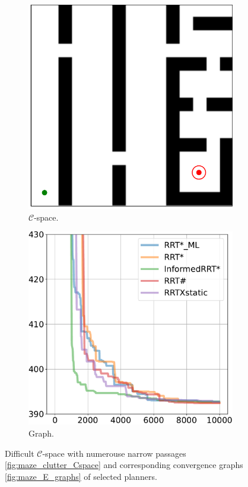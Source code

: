 \documentclass{ctuthesis}
\begin{document}
\begin{figure}[!ht]
  \centering 
  \begin{subfigure}[b]{0.48\textwidth}
      \includegraphics[width=\textwidth]{figChap5/Maze_narrow.pdf}
      \caption{$\mathcal{C}$-space.}
      \label{fig:maze_narrow_Cspace} 
  \end{subfigure}  
  \begin{subfigure}[b]{0.5\textwidth}
      \includegraphics[width=\textwidth]{figChap5/graph_narrow_20pt.pdf}  
      \caption{Graph.}
      \label{fig:maze_narrow_graphs}
  \end{subfigure}
  \caption{Difficult  $\mathcal{C}$-space with numerouse narrow passages \ref{fig:maze_clutter_Cspace} 
  and corresponding convergence graphs \ref{fig:maze_E_graphs} of selected planners.}
  \label{fig:maze_narrow}
\end{figure}
\end{document}
